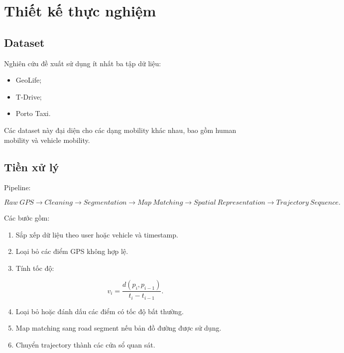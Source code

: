 \documentclass[11pt,a4paper]{article}
\begin{document}
	\section{Thiết kế thực nghiệm}
	
	\subsection{Dataset}
	
	Nghiên cứu đề xuất sử dụng ít nhất ba tập dữ liệu:
	
	\begin{itemize}
		\item GeoLife;
		\item T-Drive;
		\item Porto Taxi.
	\end{itemize}
	
	Các dataset này đại diện cho các dạng mobility khác nhau, bao gồm
	human mobility và vehicle mobility.
	
	\subsection{Tiền xử lý}
	
	Pipeline:
	
	\begin{equation}
		Raw\ GPS
		\rightarrow
		Cleaning
		\rightarrow
		Segmentation
		\rightarrow
		Map\ Matching
		\rightarrow
		Spatial\ Representation
		\rightarrow
		Trajectory\ Sequence.
	\end{equation}
	
	Các bước gồm:
	
	\begin{enumerate}
		
		\item
		Sắp xếp dữ liệu theo user hoặc vehicle và timestamp.
		
		\item
		Loại bỏ các điểm GPS không hợp lệ.
		
		\item
		Tính tốc độ:
		
		\begin{equation}
			v_i
			=
			\frac{
				d(p_i,p_{i-1})
			}{
				t_i-t_{i-1}
			}.
		\end{equation}
		
		\item
		Loại bỏ hoặc đánh dấu các điểm có tốc độ bất thường.
		
		\item
		Map matching sang road segment nếu bản đồ đường được sử dụng.
		
		\item
		Chuyển trajectory thành các cửa sổ quan sát.
		
	\end{enumerate}
	
\end{document}
